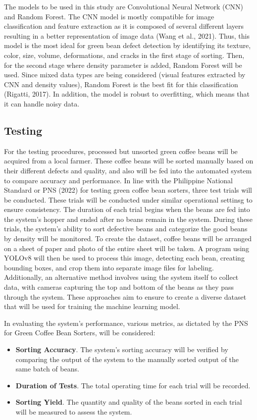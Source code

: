 The models to be used in this study are Convolutional Neural Network (CNN) and Random Forest. The CNN model is mostly compatible for image classification and feature extraction as it is composed of several different layers resulting in a better representation of image data (Wang et al., 2021). Thus, this model is the most ideal for green bean defect detection by identifying its texture, color, size, volume, deformations, and cracks in the first stage of sorting. Then, for the second stage where density parameter is added, Random Forest will be used. Since mixed data types are being considered (visual features extracted by CNN and density values), Random Forest is the best fit for this classification (Rigatti, 2017). In addition, the model is robust to overfitting, which means that it can handle noisy data. 

\subsection{Testing}
For the testing procedures, processed but unsorted green coffee beans will be acquired from a local farmer. These coffee beans will be sorted manually based on their different defects and quality, and also will be fed into the automated system to compare accuracy and performance. In line with the Philippine National Standard  or PNS (2022) for testing green coffee bean sorters, three test trials will be conducted. These trials will be conducted under similar operational settinsg to ensure consistency. The duration of each trial begins when the beans are fed into the system’s hopper and endsd after no beans remain in the system. During these trials, the system’s ability to sort defective beans and categorize the good beans by density will be monitored.
To create the dataset, coffee beans will be arranged on a sheet of paper and photo of the entire sheet will be taken. A program using YOLOv8 will then be used to process this image, detecting each bean, creating bounding boxes, and crop them into separate image files for labeling. Additionally, an alternative method involves using the system itself to collect data, with cameras capturing the top and bottom of the beans as they pass through the system. These approaches aim to ensure to create a diverse dataset that will be used for training the machine learning model.

In evaluating the system’s performance, various metrics, as dictated by the PNS for Green Coffee Bean Sorters, will be considered: 
\begin{itemize}
	\item \textbf{Sorting Accuracy}. The system’s sorting accuracy will be verified by comparing the output of the system to the manually sorted output of the same batch of beans.
	\item \textbf{Duration of Tests}. The total operating time for each trial will be recorded.
	\item \textbf{Sorting Yield}. The quantity and quality of the beans sorted in each trial will be measured to assess the system.
\end{itemize}


